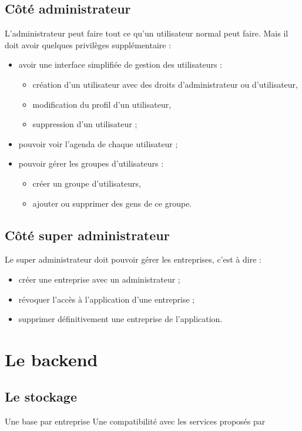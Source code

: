 \documentclass[a4paper, 11pt]{report}
\begin{document}
        \subsection{Côté administrateur}
        L'administrateur peut faire tout ce qu'un utilisateur normal peut faire. Mais il doit avoir quelques privilèges supplémentaire :
        \begin{itemize}
            \item avoir une interface simplifiée de gestion des utilisateurs :
            \begin{itemize}
                \item création d'un utilisateur avec des droits d'administrateur ou d'utilisateur,
                \item modification du profil d'un utilisateur,
                \item suppression d'un utilisateur ;
            \end{itemize}
            \item pouvoir voir l'agenda de chaque utilisateur ;
            \item pouvoir gérer les groupes d'utilisateurs :
            \begin{itemize}
                \item créer un groupe d'utilisateurs,
                \item ajouter ou supprimer des gens de ce groupe.
            \end{itemize}
        \end{itemize}
        \subsection{Côté super administrateur}
        Le super administrateur doit pouvoir gérer les entreprises, c'est à dire :
        \begin{itemize}
            \item créer une entreprise avec un administrateur ;
            \item révoquer l'accès à l'application d'une entreprise ;
            \item supprimer définitivement une entreprise de l'application.
        \end{itemize}
    \section{Le backend}
        \subsection{Le stockage}
        Une base par entreprise
        Une compatibilité avec les services proposés par \oswitch
\end{document}
